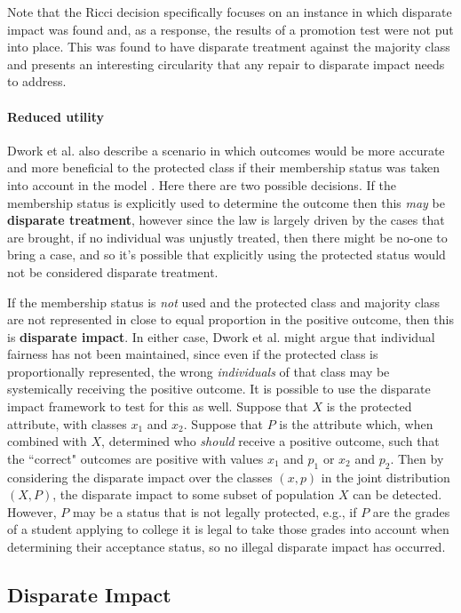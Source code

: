Note that the Ricci decision specifically focuses on an instance in which disparate impact was found and, as a response, the results of a promotion test were not put into place.  This was found to have disparate treatment against the majority class and presents an interesting circularity that any repair to disparate impact needs to address.

\paragraph{Reduced utility}  Dwork et al. also describe a scenario in which outcomes would be more accurate and more beneficial to the protected class if their membership status was taken into account in the model \cite{Dwork12Fairness}.  Here there are two possible decisions.  If the membership status is explicitly used to determine the outcome then this \emph{may} be \textbf{disparate treatment}, however since the law is largely driven by the cases that are brought, if no individual was unjustly treated, then there might be no-one to bring a case, and so it's possible that explicitly using the protected status would not be considered disparate treatment.

If the membership status is \emph{not} used and the protected class and majority class are not represented in close to equal proportion in the positive outcome, then this is \textbf{disparate impact}.  In either case, Dwork et al. might argue that individual fairness has not been maintained, since even if the protected class is proportionally represented, the wrong \emph{individuals} of that class may be systemically receiving the positive outcome.  It is possible to use the disparate impact framework to test for this as well.  Suppose that $X$ is the protected attribute, with classes $x_1$ and $x_2$.  Suppose that $P$ is the attribute which, when combined with $X$, determined who \emph{should} receive a positive outcome, such that the ``correct" outcomes are positive with values $x_1$ and $p_1$ or $x_2$ and $p_2$.  Then by considering the disparate impact over the classes $(x, p)$ in the joint distribution $(X, P)$, the disparate impact to some subset of population $X$ can be detected.  However, $P$ may be a status that is not legally protected, e.g., if $P$ are the grades of a student applying to college it is legal to take those grades into account when determining their acceptance status, so no illegal disparate impact has occurred.



\subsection{Disparate Impact}

